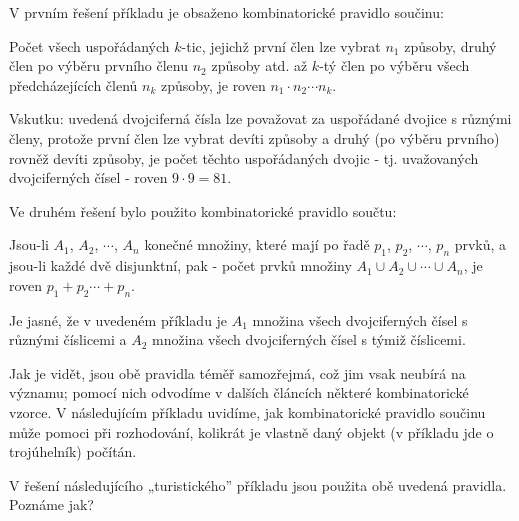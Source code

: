     

    V prvním řešení příkladu je obsaženo kombinatorické pravidlo součinu:
    
    \begin{mdframed}[style=highlight] Počet všech uspořádaných \(k\)-tic, jejichž první člen lze
      vybrat \(n_1\) způsoby, druhý člen po výběru prvního členu \(n_2\) způsoby atd. až \(k\)-tý
      člen po výběru všech předcházejících členů \(n_k\) způsoby, je roven \(n_1\cdot n_2\cdots
      n_k\).
    \end{mdframed}

    Vskutku: uvedená dvojciferná čísla lze považovat za uspořádané dvojice s různými členy, protože
    první člen lze vybrat devíti způsoby a druhý (po výběru prvního) rovněž devíti způsoby, je počet
    těchto uspořádaných dvojic - tj. uvažovaných dvojciferných čísel - roven \(9\cdot9= 81\).

    Ve druhém řešení bylo použito kombinatorické pravidlo součtu:
    
    \begin{mdframed}[style=highlight] Jsou-li \(A_1\), \(A_2\), \(\cdots\), \(A_n\) konečné množiny,
      které mají po řadě \(p_1\), \(p_2\), \(\cdots\), \(p_n\) prvků, a jsou-li každé dvě
      disjunktní, pak - počet prvků množiny \(A_1 \cup A_2 \cup\cdots\cup A_n\), je roven \(p_1 +
      p_2 \cdots + p_n\).        
    \end{mdframed}

    Je jasné, že v uvedeném příkladu je \(A_1\) množina všech dvojciferných čísel s různými
    číslicemi a \(A_2\) množina všech dvojciferných čísel s týmiž číslicemi. 
    
    Jak je vidět, jsou obě pravidla téměř samozřejmá, což jim vsak neubírá na významu; pomocí nich
    odvodíme v dalších článcích některé kombinatorické vzorce. V následujícím příkladu uvidíme, jak
    kombinatorické pravidlo součinu může pomoci při rozhodování, kolikrát je vlastně daný objekt (v
    příkladu jde o trojúhelník) počítán.
  
    

    V řešení následujícího „turistického” příkladu jsou použita obě uvedená pravidla. Poznáme jak?
    
